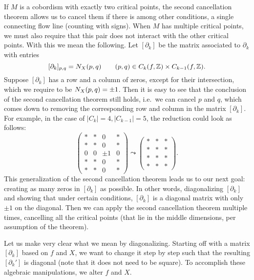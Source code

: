 If $M$ is a cobordism with exactly two critical points,
the second cancellation theorem allows us to cancel them if there is among other conditions, a single connecting flow line (counting with signs).
When $M$ has multiple critical points, we must also require that this pair does not interact with the other critical points.
With this we mean the following.
Let $[\partial_k]$ be the matrix associated to $\partial_k$ with entries \[
    [\partial_k]_{p, q} = N_{X}(p, q) \qquad (p,q) \in C_k(f, \mathbb{Z}) \times  C_{k-1}(f, \mathbb{Z}).
\]
Suppose $[\partial_k]$ has a row and a column of zeros, except for their intersection, which we require to be $N_{X}(p, q) = \pm 1 $.
Then it is easy to see that the conclusion of the second cancellation theorem still holds,  i.e.\ we can cancel $p$ and  $q$, which comes down to removing the corresponding row and column in the matrix $[\partial_k]$.
For example, in the case of $|C_k| = 4, |C_{k-1}| = 5$, the reduction could look as follows:
\[
    \begin{pmatrix}
        * & *&0 & *\\
        * & *&0 & *\\
        0 & 0&\pm 1 & 0 \\
        * & *&0 & *\\
        * & *&0 & *
    \end{pmatrix}
\leadsto
\begin{pmatrix}
    * & *& *\\
    * & *& *\\
    * & *& *\\
    * & *& *
\end{pmatrix}
.\] 
This generalization of the second cancellation theorem leads us to our next goal: creating as many zeros in $[\partial_k]$ as possible.
In other words, diagonalizing $[\partial_k]$ and showing that under certain conditions,  $[\partial_k]$ is a diagonal matrix with only $\pm 1$ on the diagonal. Then we can apply the second cancellation theorem multiple times, cancelling all the critical points (that lie in the middle dimensions, per assumption of the theorem).

Let us make very clear what we mean by diagonalizing.
Starting off with a matrix $[\partial_k]$ based on $f$ and $X$, we want to change it step by step such that the resulting $[\partial_k']$ is diagonal (note that it does not need to be square).
To accomplish these algebraic manipulations, we alter $f$ and  $X$.

